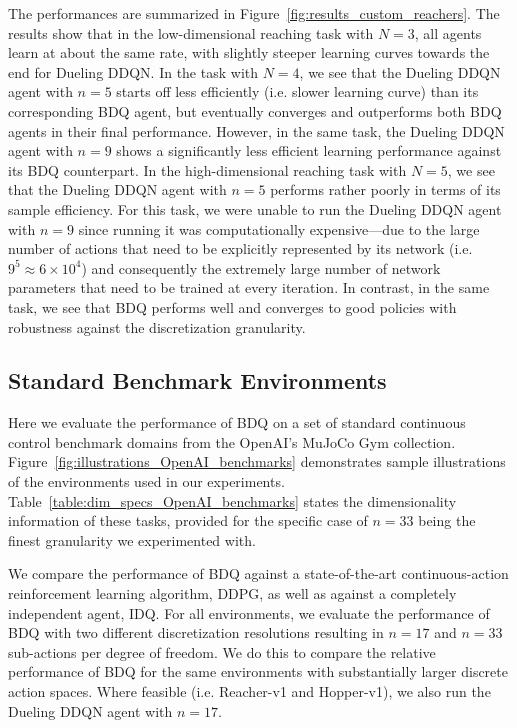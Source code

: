 \documentclass[letterpaper]{article} %
\begin{document}
The performances are summarized in Figure~\ref{fig:results_custom_reachers}. The results show that in the low-dimensional reaching task with $N=3$, all agents learn at about the same rate, with slightly steeper learning curves towards the end for Dueling DDQN. In the task with $N=4$, we see that the Dueling DDQN agent with $n=5$ starts off less efficiently (i.e. slower learning curve) than its corresponding BDQ agent, but eventually converges and outperforms both BDQ agents in their final performance. However, in the same task, the Dueling DDQN agent with $n=9$ shows a significantly less efficient learning performance against its BDQ counterpart. In the high-dimensional reaching task with $N=5$, we see that the Dueling DDQN agent with $n=5$ performs rather poorly in terms of its sample efficiency. For this task, we were unable to run the Dueling DDQN agent with $n=9$ since running it was computationally expensive---due to the large number of actions that need to be explicitly represented by its network (i.e. $9^5 \approx 6 \times 10^4$) and consequently the extremely large number of network parameters that need to be trained at every iteration. In contrast, in the same task, we see that BDQ performs well and converges to good policies with robustness against the discretization granularity.


\subsection{Standard Benchmark Environments}
\label{sec:experiments_openai}

Here we evaluate the performance of BDQ on a set of standard continuous control benchmark domains from the OpenAI's MuJoCo Gym collection. Figure~\ref{fig:illustrations_OpenAI_benchmarks} demonstrates sample illustrations of the environments used in our experiments. Table~\ref{table:dim_specs_OpenAI_benchmarks} states the dimensionality information of these tasks, provided for the specific case of $n=33$ being the finest granularity we experimented with.

We compare the performance of BDQ against a state-of-the-art continuous-action reinforcement learning algorithm, DDPG, as well as against a completely independent agent, IDQ. For all environments, we evaluate the performance of BDQ with two different discretization resolutions resulting in $n=17$ and $n=33$ sub-actions per degree of freedom. We do this to compare the relative performance of BDQ for the same environments with substantially larger discrete action spaces. Where feasible (i.e. Reacher-v1 and Hopper-v1), we also run the Dueling DDQN agent with $n=17$.
\end{document}
